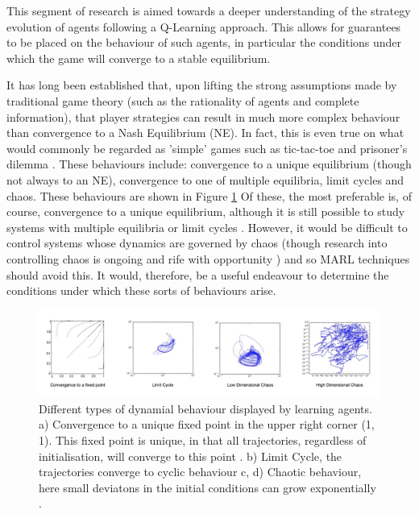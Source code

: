 \documentclass[.../main.tex]{subfiles}
\begin{document}
    This segment of research is aimed towards a deeper understanding of the strategy evolution
    of agents following a Q-Learning approach. This allows for guarantees to be placed on the
    behaviour of such agents, in particular the conditions under which the game will converge to a
    stable equilibrium.

    It has long been established that, upon lifting the strong assumptions made by traditional
    game theory (such as the rationality of agents and complete information), that player
    strategies can result in much more complex behaviour than convergence to a Nash Equilibrium 
    (NE). In fact, this is even true on what would commonly be regarded as 'simple' games such
    as tic-tac-toe and prisoner's dilemma \cite{Galla2011, Sato2002}. These
    behaviours include: convergence to a unique equilibrium (though not always to an NE),
    convergence to one of multiple equilibria, limit cycles and chaos. These behaviours are shown in
    Figure \ref{fig::DynamicalBehaviours} Of these, the most preferable is, of course, convergence to a unique equilibrium,
    although it is still possible to study systems with multiple equilibria or limit cycles 
    \cite{Strogatz2000}. However, it would be difficult to control systems whose dynamics
    are governed by chaos (though research into controlling chaos is ongoing and rife with
    opportunity \cite{Fradkov2009}) and so MARL techniques should avoid this. It would,
    therefore, be a useful endeavour to determine the conditions under which these sorts of
    behaviours arise.

    \begin{figure}[h]
    	\centering
    	\includegraphics[width=1.1\textwidth]{Figures/DynamicalBehaviours}
    	\caption{ \label{fig::DynamicalBehaviours} Different types of dynamial behaviour displayed
    	by learning agents. a)
    	Convergence
    	to a unique fixed point in the upper right corner (1, 1). This fixed point is unique, in
    	that all trajectories, regardless of initialisation, will converge to this point 
    	\cite{Tuyls2006AnGames}. b) Limit Cycle, the trajectories converge to cyclic behaviour c,
    	d) Chaotic behaviour, here small deviatons in the initial conditions can grow
    	exponentially \cite{Sanders2018}.}
    \end{figure}
\end{document}
